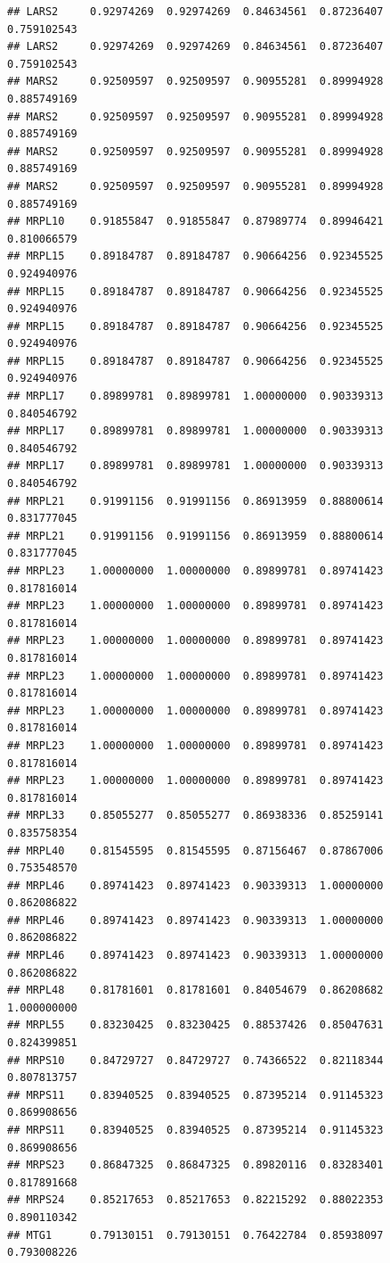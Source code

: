 \documentclass[
]{article}
\begin{document}
\begin{verbatim}
## LARS2     0.92974269  0.92974269  0.84634561  0.87236407  0.759102543
## LARS2     0.92974269  0.92974269  0.84634561  0.87236407  0.759102543
## MARS2     0.92509597  0.92509597  0.90955281  0.89994928  0.885749169
## MARS2     0.92509597  0.92509597  0.90955281  0.89994928  0.885749169
## MARS2     0.92509597  0.92509597  0.90955281  0.89994928  0.885749169
## MARS2     0.92509597  0.92509597  0.90955281  0.89994928  0.885749169
## MRPL10    0.91855847  0.91855847  0.87989774  0.89946421  0.810066579
## MRPL15    0.89184787  0.89184787  0.90664256  0.92345525  0.924940976
## MRPL15    0.89184787  0.89184787  0.90664256  0.92345525  0.924940976
## MRPL15    0.89184787  0.89184787  0.90664256  0.92345525  0.924940976
## MRPL15    0.89184787  0.89184787  0.90664256  0.92345525  0.924940976
## MRPL17    0.89899781  0.89899781  1.00000000  0.90339313  0.840546792
## MRPL17    0.89899781  0.89899781  1.00000000  0.90339313  0.840546792
## MRPL17    0.89899781  0.89899781  1.00000000  0.90339313  0.840546792
## MRPL21    0.91991156  0.91991156  0.86913959  0.88800614  0.831777045
## MRPL21    0.91991156  0.91991156  0.86913959  0.88800614  0.831777045
## MRPL23    1.00000000  1.00000000  0.89899781  0.89741423  0.817816014
## MRPL23    1.00000000  1.00000000  0.89899781  0.89741423  0.817816014
## MRPL23    1.00000000  1.00000000  0.89899781  0.89741423  0.817816014
## MRPL23    1.00000000  1.00000000  0.89899781  0.89741423  0.817816014
## MRPL23    1.00000000  1.00000000  0.89899781  0.89741423  0.817816014
## MRPL23    1.00000000  1.00000000  0.89899781  0.89741423  0.817816014
## MRPL23    1.00000000  1.00000000  0.89899781  0.89741423  0.817816014
## MRPL33    0.85055277  0.85055277  0.86938336  0.85259141  0.835758354
## MRPL40    0.81545595  0.81545595  0.87156467  0.87867006  0.753548570
## MRPL46    0.89741423  0.89741423  0.90339313  1.00000000  0.862086822
## MRPL46    0.89741423  0.89741423  0.90339313  1.00000000  0.862086822
## MRPL46    0.89741423  0.89741423  0.90339313  1.00000000  0.862086822
## MRPL48    0.81781601  0.81781601  0.84054679  0.86208682  1.000000000
## MRPL55    0.83230425  0.83230425  0.88537426  0.85047631  0.824399851
## MRPS10    0.84729727  0.84729727  0.74366522  0.82118344  0.807813757
## MRPS11    0.83940525  0.83940525  0.87395214  0.91145323  0.869908656
## MRPS11    0.83940525  0.83940525  0.87395214  0.91145323  0.869908656
## MRPS23    0.86847325  0.86847325  0.89820116  0.83283401  0.817891668
## MRPS24    0.85217653  0.85217653  0.82215292  0.88022353  0.890110342
## MTG1      0.79130151  0.79130151  0.76422784  0.85938097  0.793008226

\end{verbatim}
\end{document}
